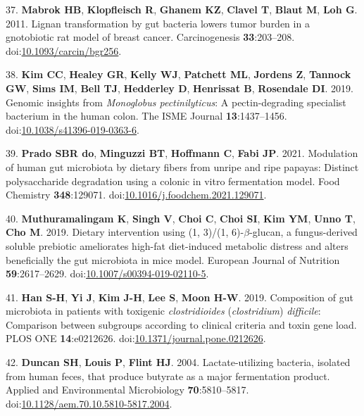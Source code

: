\documentclass[
  12pt,
]{article}
\newenvironment{cslreferences}%
  {}%
  {\par}
\begin{document}
\begin{cslreferences}
\leavevmode\hypertarget{ref-Mabrok2011}{}%
37. \textbf{Mabrok HB}, \textbf{Klopfleisch R}, \textbf{Ghanem KZ},
\textbf{Clavel T}, \textbf{Blaut M}, \textbf{Loh G}. 2011. Lignan
transformation by gut bacteria lowers tumor burden in a gnotobiotic rat
model of breast cancer. Carcinogenesis \textbf{33}:203--208.
doi:\href{https://doi.org/10.1093/carcin/bgr256}{10.1093/carcin/bgr256}.

\leavevmode\hypertarget{ref-Kim2019}{}%
38. \textbf{Kim CC}, \textbf{Healey GR}, \textbf{Kelly WJ},
\textbf{Patchett ML}, \textbf{Jordens Z}, \textbf{Tannock GW},
\textbf{Sims IM}, \textbf{Bell TJ}, \textbf{Hedderley D},
\textbf{Henrissat B}, \textbf{Rosendale DI}. 2019. Genomic insights from
\emph{Monoglobus pectinilyticus}: A pectin-degrading specialist
bacterium in the human colon. The ISME Journal \textbf{13}:1437--1456.
doi:\href{https://doi.org/10.1038/s41396-019-0363-6}{10.1038/s41396-019-0363-6}.

\leavevmode\hypertarget{ref-doPrado2021}{}%
39. \textbf{Prado SBR do}, \textbf{Minguzzi BT}, \textbf{Hoffmann C},
\textbf{Fabi JP}. 2021. Modulation of human gut microbiota by dietary
fibers from unripe and ripe papayas: Distinct polysaccharide degradation
using a colonic in vitro fermentation model. Food Chemistry
\textbf{348}:129071.
doi:\href{https://doi.org/10.1016/j.foodchem.2021.129071}{10.1016/j.foodchem.2021.129071}.

\leavevmode\hypertarget{ref-Muthuramalingam2019}{}%
40. \textbf{Muthuramalingam K}, \textbf{Singh V}, \textbf{Choi C},
\textbf{Choi SI}, \textbf{Kim YM}, \textbf{Unno T}, \textbf{Cho M}.
2019. Dietary intervention using (1, 3)/(1, 6)-\(\beta\)-glucan, a
fungus-derived soluble prebiotic ameliorates high-fat diet-induced
metabolic distress and alters beneficially the gut microbiota in mice
model. European Journal of Nutrition \textbf{59}:2617--2629.
doi:\href{https://doi.org/10.1007/s00394-019-02110-5}{10.1007/s00394-019-02110-5}.

\leavevmode\hypertarget{ref-Han2019}{}%
41. \textbf{Han S-H}, \textbf{Yi J}, \textbf{Kim J-H}, \textbf{Lee S},
\textbf{Moon H-W}. 2019. Composition of gut microbiota in patients with
toxigenic \emph{clostridioides} (\emph{clostridium}) \emph{difficile}:
Comparison between subgroups according to clinical criteria and toxin
gene load. PLOS ONE \textbf{14}:e0212626.
doi:\href{https://doi.org/10.1371/journal.pone.0212626}{10.1371/journal.pone.0212626}.

\leavevmode\hypertarget{ref-Duncan2004}{}%
42. \textbf{Duncan SH}, \textbf{Louis P}, \textbf{Flint HJ}. 2004.
Lactate-utilizing bacteria, isolated from human feces, that produce
butyrate as a major fermentation product. Applied and Environmental
Microbiology \textbf{70}:5810--5817.
doi:\href{https://doi.org/10.1128/aem.70.10.5810-5817.2004}{10.1128/aem.70.10.5810-5817.2004}.


\end{cslreferences}
\end{document}
